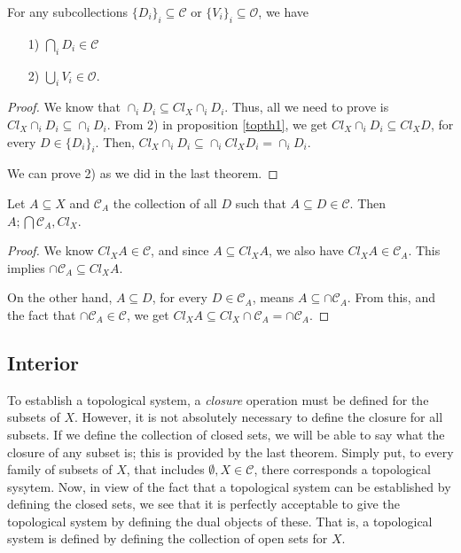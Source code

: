 \documentclass [12pt]{book}
\begin{document}
\begin{theorem}For any subcollections $\{D_{i}\}_{i}\subseteq\mathcal{C}$ or $\{V_{i}\}_{i}\subseteq\mathcal{O}$, we have
\begin{itemize}\item[1)]$\bigcap_{i}D_{i}\in\mathcal{C}$\item[2)]$\bigcup_{i}
V_{i}\in\mathcal{O}$.\end{itemize}\end{theorem}

\begin{proof}We know that $\cap_iD_i\subseteq Cl_X\cap_iD_i$. Thus, all we need to prove is $Cl_X\cap_iD_i\subseteq \cap_iD_i$. From 2) in proposition \ref{topth1}, we get $Cl_X\cap_iD_i\subseteq Cl_XD$, for every $D\in\{D_i\}_i$. Then, $Cl_X\cap_iD_i\subseteq\cap_i Cl_XD_i=\cap_i D_i$.

We can prove 2) as we did in the last theorem.\end{proof}

\begin{theorem}Let $A\subseteq X$ and $\mathcal{C}_{A}$ the collection of all $D$ such that $A\subseteq D\in\mathcal{C}$. Then $A;\bigcap\mathcal{C}_{A},Cl_X$.\end{theorem}

\begin{proof}We know $Cl_XA\in\mathcal{C}$, and since $A\subseteq Cl_XA$, we also have $Cl_XA\in\mathcal{C}_{A}$. This implies $\cap\mathcal{C}_{A}\subseteq Cl_XA$.

On the other hand, $A\subseteq D$, for every $D\in\mathcal{C}_{A}$, means $A\subseteq\cap\mathcal{C}_{A}$. From this, and the fact that $\cap\mathcal{C}_{A}\in\mathcal{C}$, we get $Cl_XA\subseteq Cl_X\cap\mathcal{C}_{A}=\cap\mathcal{C}_{A}$.\end{proof}

	\subsection{Interior}

To establish a topological system, a \textit{closure} operation must be defined for the subsets of $X$. However, it is not absolutely necessary to define the closure for all subsets. If we define the collection of closed sets, we will be able to say what the closure of any subset is; this is provided by the last theorem. Simply put, to every family of subsets of $X$, that includes $\emptyset,X\in\mathcal{C}$, there corresponds a topological sysytem. Now, in view of the fact that a topological system can be established by defining the closed sets, we see that it is perfectly acceptable to give the topological system by defining the dual objects of these. That is, a topological system is defined by defining the collection of open sets for $X$.
\end{document}
